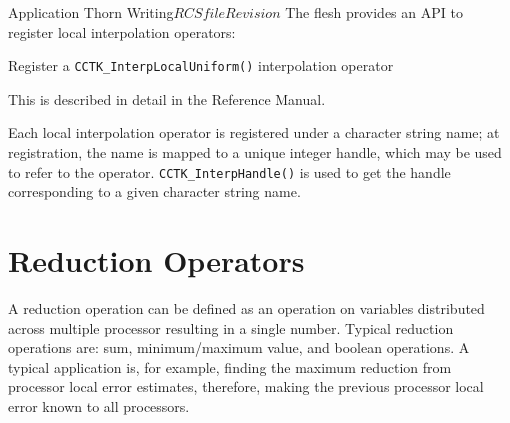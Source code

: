 \begin{cactuspart}{Application Thorn Writing}{$RCSfile$}{$Revision$}
The flesh provides an API to register local interpolation operators:
\begin{Lentry}
\item[\texttt{CCTK\_InterpRegisterOpLocalUniform()}]
        Register a \verb|CCTK_InterpLocalUniform()| interpolation operator
\end{Lentry}
This is described in detail in the Reference Manual.

Each local interpolation operator is registered under a character string name;
at registration, the name is mapped to a unique integer handle, which
may be used to refer to the operator.  \verb|CCTK_InterpHandle()|
is used to get the handle corresponding to a given character string
name.


\section{Reduction Operators}
\label{sec:reop}

A reduction operation can be defined as an operation on variables
distributed  across multiple processor resulting in a single number.
Typical reduction operations are: sum, minimum/maximum value, and boolean
operations. A typical application is, for example, 
finding the maximum reduction from processor local error estimates, 
therefore, making the previous processor local error known to all processors. 


\end{cactuspart}
